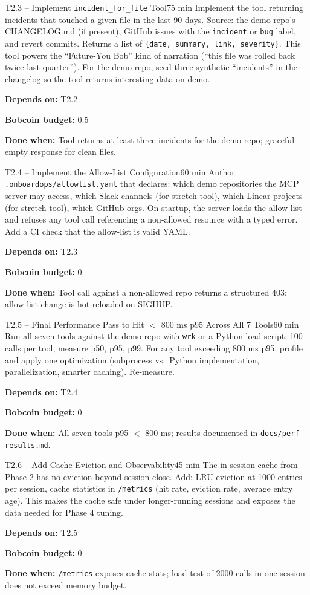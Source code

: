 \documentclass[11pt,letterpaper]{article}
\newcommand{\acceptance}[1]{\par\smallskip\textcolor{ibmgreen}{\textbf{Done when:}} #1}
\newcommand{\depends}[1]{\par\smallskip\textcolor{ibmorange}{\textbf{Depends on:}} #1}
\newcommand{\bobcost}[1]{\par\smallskip\textcolor{ibmaccent}{\textbf{Bobcoin budget:}} #1}
\begin{document}
\begin{task}{T2.3 -- Implement \texttt{incident\_for\_file} Tool}{75 min}
Implement the tool returning incidents that touched a given file in the last 90 days. Source: the demo repo's CHANGELOG.md (if present), GitHub issues with the \texttt{incident} or \texttt{bug} label, and revert commits. Returns a list of \texttt{\{date, summary, link, severity\}}. This tool powers the ``Future-You Bob'' kind of narration (``this file was rolled back twice last quarter''). For the demo repo, seed three synthetic ``incidents'' in the changelog so the tool returns interesting data on demo.
\depends{T2.2}
\bobcost{0.5}
\acceptance{Tool returns at least three incidents for the demo repo; graceful empty response for clean files.}
\end{task}

\begin{task}{T2.4 -- Implement the Allow-List Configuration}{60 min}
Author \texttt{.onboardops/allowlist.yaml} that declares: which demo repositories the MCP server may access, which Slack channels (for stretch tool), which Linear projects (for stretch tool), which GitHub orgs. On startup, the server loads the allow-list and refuses any tool call referencing a non-allowed resource with a typed error. Add a CI check that the allow-list is valid YAML.
\depends{T2.3}
\bobcost{0}
\acceptance{Tool call against a non-allowed repo returns a structured 403; allow-list change is hot-reloaded on SIGHUP.}
\end{task}

\begin{task}{T2.5 -- Final Performance Pass to Hit $<$ 800 ms p95 Across All 7 Tools}{60 min}
Run all seven tools against the demo repo with \texttt{wrk} or a Python load script: 100 calls per tool, measure p50, p95, p99. For any tool exceeding 800 ms p95, profile and apply one optimization (subprocess vs.~Python implementation, parallelization, smarter caching). Re-measure.
\depends{T2.4}
\bobcost{0}
\acceptance{All seven tools p95 $<$ 800 ms; results documented in \texttt{docs/perf-results.md}.}
\end{task}

\begin{task}{T2.6 -- Add Cache Eviction and Observability}{45 min}
The in-session cache from Phase 2 has no eviction beyond session close. Add: LRU eviction at 1000 entries per session, cache statistics in \texttt{/metrics} (hit rate, eviction rate, average entry age). This makes the cache safe under longer-running sessions and exposes the data needed for Phase 4 tuning.
\depends{T2.5}
\bobcost{0}
\acceptance{\texttt{/metrics} exposes cache stats; load test of 2000 calls in one session does not exceed memory budget.}
\end{task}
\end{document}
